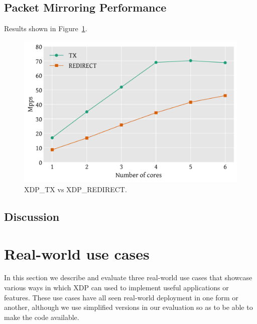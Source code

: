 \documentclass[10pt,sigconf]{acmart}
\begin{document}
\subsection{Packet Mirroring Performance}
\label{sec:pack-mirr-perf}
Results shown in Figure~\ref{fig:tx-test}.
\begin{figure}[t]
\centering
\includegraphics[width=\linewidth]{figures/tx-test.pdf}
\caption{\label{fig:tx-test} XDP\_TX vs XDP\_REDIRECT.}
\end{figure}



\subsection{Discussion}
\label{sec:perf-discussion}

%

\section{Real-world use cases}
\label{sec:usecases}
In this section we describe and evaluate three real-world use cases that
showcase various ways in which XDP can used to implement useful applications or
features. These use cases have all seen real-world deployment in one form or
another, although we use simplified versions in our evaluation so as to be able
to make the code available.
\end{document}
